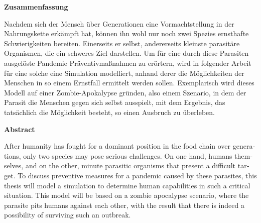 \label{sec:abstract}
    \begin{center}
      \textbf{Zusammenfassung}
    \end{center}
    Nachdem sich der Mensch über Generationen eine Vormachtstellung in der Nahrungskette erkämpft hat, können ihn wohl nur noch zwei Spezies ernsthafte Schwierigkeiten bereiten. Einerseits er selbst, andererseits kleinste parasitäre Organismen, die ein schweres Ziel darstellen. Um für eine durch diese Parasiten ausgelöste Pandemie Präventivmaßnahmen zu erörtern, wird in folgender Arbeit für eine solche eine Simulation modelliert, anhand derer die Möglichkeiten der Menschen in so einem Ernstfall ermittelt werden sollen. Exemplarisch wird dieses Modell auf einer Zombie-Apokalypse gründen, also einem Szenario, in dem der Parasit die Menschen gegen sich selbst ausspielt, mit dem Ergebnis, das tatsächlich die Möglichkeit besteht, so einen Ausbruch zu überleben.
\vspace{4em}
    \begin{otherlanguage}{english}
        \begin{center}
          \textbf{Abstract}
        \end{center}
        After humanity has fought for a dominant position in the food chain over generations, only two species may pose serious challenges. On one hand, humans themselves, and on the other, minute parasitic organisms that present a difficult target. To discuss preventive measures for a pandemic caused by these parasites, this thesis will model a simulation to determine human capabilities in such a critical situation. This model will be based on a zombie apocalypse scenario, where the parasite pits humans against each other, with the result that there is indeed a possibility of surviving such an outbreak.
    \end{otherlanguage}